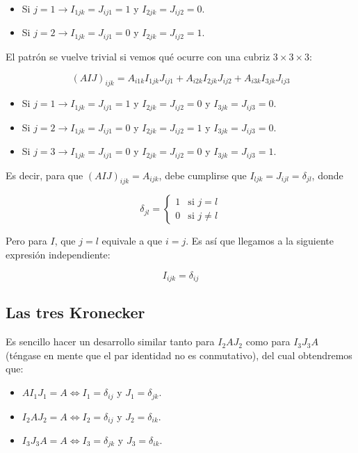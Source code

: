 \documentclass[a4paper, titlepage]{article}
\begin{document}
\begin{itemize}
	\item Si $j = 1 \rightarrow I_{1jk} = J_{ij1} = 1$ y $I_{2jk} = J_{ij2} = 0$.
	\item Si $j = 2 \rightarrow I_{1jk} = J_{ij1} = 0$ y $I_{2jk} = J_{ij2} = 1$.
\end{itemize}

El patrón se vuelve trivial si vemos qué ocurre con una cubriz $3 \times 3 \times 3$:

$$(AIJ)_{ijk} = A_{i1k} I_{1jk} J_{ij1} + A_{i2k} I_{2jk} J_{ij2} + A_{i3k} I_{3jk} J_{ij3}$$

\begin{itemize}
	\item Si $j = 1 \rightarrow I_{1jk} = J_{ij1} = 1$ y $I_{2jk} = J_{ij2} = 0$ y $I_{3jk} = J_{ij3} = 0$.
	\item Si $j = 2 \rightarrow I_{1jk} = J_{ij1} = 0$ y $I_{2jk} = J_{ij2} = 1$ y $I_{3jk} = J_{ij3} = 0$.
	\item Si $j = 3 \rightarrow I_{1jk} = J_{ij1} = 0$ y $I_{2jk} = J_{ij2} = 0$ y $I_{3jk} = J_{ij3} = 1$.
\end{itemize}

Es decir, para que $(AIJ)_{ijk} = A_{ijk}$, debe cumplirse que $I_{ljk} = J_{ijl} = \delta_{jl}$, donde

\begin{equation}
	\delta_{jl} =
	\begin{cases}
		1 & \text{si } j = l \\
		0 & \text{si } j \neq l
	\end{cases}
\end{equation}

Pero para $I$, que $j = l$ equivale a que $i = j$. Es así que llegamos a la siguiente expresión independiente:

$$I_{ijk} = \delta_{ij}$$

\subsection{Las tres Kronecker}

Es sencillo hacer un desarrollo similar tanto para $I_2AJ_2$ como para $I_3J_3A$ (téngase en mente que el par identidad no es conmutativo), del cual obtendremos que:

\begin{itemize}
	\item $AI_1J_1 = A \Leftrightarrow I_1 = \delta_{ij}$ y $J_1 = \delta_{jk}$.
	\item $I_2AJ_2 = A \Leftrightarrow I_2 = \delta_{ij}$ y $J_2 = \delta_{ik}$.
	\item $I_3J_3A = A \Leftrightarrow I_3 = \delta_{jk}$ y $J_3 = \delta_{ik}$.
\end{itemize}
\end{document}
